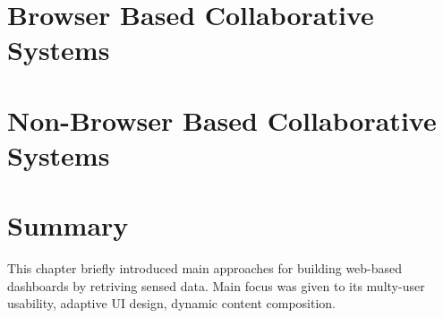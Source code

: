 \section{Browser Based Collaborative Systems}

\section{Non-Browser Based Collaborative Systems}

\section{Summary}
This chapter briefly introduced main approaches for building web-based dashboards by retriving sensed data. Main focus was given to its multy-user usability, adaptive UI design, dynamic content composition.
